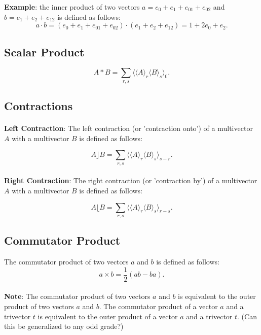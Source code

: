 \documentclass{article}
\begin{document}
\textbf{Example}: the inner product of two vectors $a = e_0 + e_1 + e_{01} + e_{02}$ and $b = e_1 + e_2 + e_{12}$ 
is defined as follows: $$a \cdot b = (e_0 + e_1 + e_{01} + e_{02}) \cdot (e_1 + e_2 + e_{12}) = 1 + 2e_0 + e_2.$$

\subsection{\textbf{Scalar Product}}
$$ A * B = \sum_{r,s} \langle \langle A \rangle_{r} \langle B \rangle_{s} \rangle_{0}.$$

\subsection{\textbf{Contractions}}

\paragraph{}\textbf{Left Contraction}: The left contraction (or 'contraction onto') of a multivector $A$ with a multivector $B$ is defined as follows:

$$A\rfloor B = \sum_{r,s} \langle \langle A \rangle_{r} \langle B \rangle_{s} \rangle_{s - r}.$$

\paragraph{}\textbf{Right Contraction}: The right contraction (or 'contraction by') of a multivector $A$ with a multivector $B$ is defined as follows:

$$A\lfloor B = \sum_{r,s} \langle \langle A \rangle_{r} \langle B \rangle_{s} \rangle_{r - s}.$$

\subsection{\textbf{Commutator Product}}
The commutator product of two vectors $a$ and $b$ is defined as follows: 
$$a \times b = \frac{1}{2}(ab - ba).$$

\paragraph{}
    \textbf{Note}: The commutator product of two vectors $a$ and $b$ is equivalent to 
    the outer product of two vectors $a$ and $b$. The commutator product of a vector $a$ and a trivector $t$ 
    is equivalent to the outer product of a vector $a$ and a trivector $t$. (Can this be generalized to any odd grade?)
\end{document}
